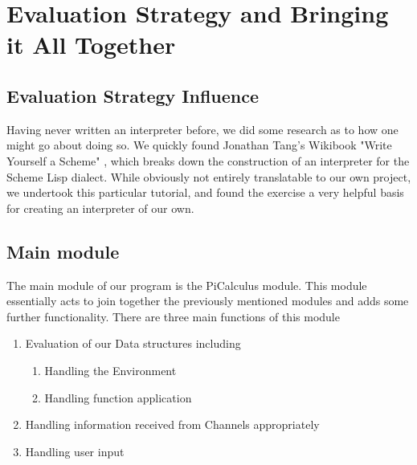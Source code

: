 \section{Evaluation Strategy and Bringing it All Together}
\label{sec:main}
\subsection{Evaluation Strategy Influence}
Having never written an interpreter before, we did some research as to how one might go about doing so. We quickly found Jonathan Tang's Wikibook "Write Yourself a Scheme" \cite{wyas}, which breaks down the construction of an interpreter for the Scheme Lisp dialect. While obviously not entirely translatable to our own project, we undertook this particular tutorial, and found the exercise a very helpful basis for creating an interpreter of our own.

\subsection{Main module}
The main module of our program is the PiCalculus module. This module essentially acts to join together the previously mentioned modules and adds some further functionality. 
There are three main functions of this module
\begin{enumerate}
    \item Evaluation of our Data structures including
        \begin{enumerate}
            \item Handling the Environment
            \item Handling function application
        \end{enumerate}
    \item Handling information received from Channels appropriately
    \item Handling user input
\end{enumerate}



